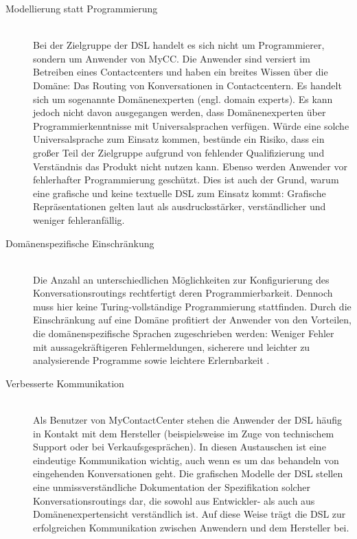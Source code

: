 \begin{description}
\item[Modellierung statt Programmierung] \hfill \\
Bei der Zielgruppe der DSL handelt es sich nicht um Programmierer, sondern um Anwender von MyCC. Die Anwender sind versiert im Betreiben eines Contactcenters und haben ein breites Wissen über die Domäne: Das Routing von Konversationen in Contactcentern. Es handelt sich um sogenannte Domänenexperten (engl. domain experts). Es kann jedoch nicht davon ausgegangen werden, dass Domänenexperten über Programmierkenntnisse mit Universalsprachen verfügen. Würde eine solche Universalsprache zum Einsatz kommen, bestünde ein Risiko, dass ein großer Teil der Zielgruppe aufgrund von fehlender Qualifizierung und Verständnis das Produkt nicht nutzen kann. Ebenso werden Anwender vor fehlerhafter Programmierung geschützt. Dies ist auch der Grund, warum eine grafische und keine textuelle DSL zum Einsatz kommt: Grafische Repräsentationen gelten laut \cite[S. 50f]{Kelly:08} als ausdrucksstärker, verständlicher und weniger fehleranfällig.
\item[Domänenspezifische Einschränkung] \hfill \\
Die Anzahl an unterschiedlichen Möglichkeiten zur Konfigurierung des Konversationsroutings rechtfertigt deren Programmierbarkeit. Dennoch muss hier keine Turing-vollständige Programmierung stattfinden. Durch die Einschränkung auf eine Domäne profitiert der Anwender von den Vorteilen, die do\-mä\-nen\-spe\-zi\-fi\-sche Sprachen zugeschrieben werden: Weniger Fehler mit aussagekräftigeren Fehlermeldungen, sicherere und leichter zu analysierende Programme sowie leichtere Erlernbarkeit \cite{Tomassetti:17}.
\item[Verbesserte Kommunikation] \hfill \\
Als Benutzer von MyContactCenter stehen die Anwender der DSL häufig in Kontakt mit dem Hersteller (beispielsweise im Zuge von technischem Support oder bei Verkaufsgesprächen). In diesen Austauschen ist eine eindeutige Kommunikation wichtig, auch wenn es um das behandeln von eingehenden Konversationen geht. Die grafischen Modelle der DSL stellen eine unmissverständliche Dokumentation der Spezifikation solcher Konversationsroutings dar, die sowohl aus Entwickler- als auch aus Domänenexpertensicht verständlich ist. Auf diese Weise trägt die DSL zur erfolgreichen Kommunikation zwischen Anwendern und dem Hersteller bei.
\end{description}


